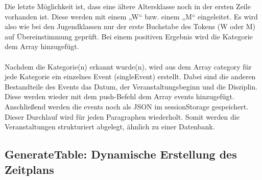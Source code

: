 Die letzte Möglichkeit ist, dass eine ältere Altersklasse noch in der ersten Zeile vorhanden ist. Diese werden mit einem „W“ bzw. einem „M“ eingeleitet. Es wird also wie bei den Jugendklassen nur der erste Buchstabe des Tokens (W oder M) auf Übereinstimmung geprüft. Bei einem positiven Ergebnis wird die Kategorie dem Array hinzugefügt.\\
\\
Nachdem die Kategorie(n) erkannt wurde(n), wird aus dem Array category für jede Kategorie ein einzelnes Event (singleEvent) erstellt. Dabei sind die anderen Bestandteile des Events das Datum, der Veranstaltungsbeginn und die Disziplin. Diese werden wieder mit dem push-Befehl dem Array events hinzugefügt. Anschließend werden die events noch als JSON im sessionStorage gespeichert. 
Dieser Durchlauf wird für jeden Paragraphen wiederholt. Somit werden die Veranstaltungen strukturiert abgelegt, ähnlich zu einer Datenbank.

\subsection{GenerateTable: Dynamische Erstellung des Zeitplans}

